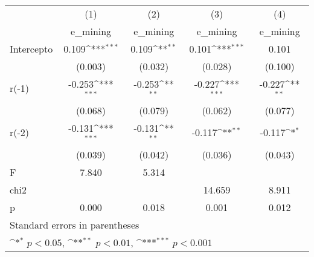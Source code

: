{
\def\sym#1{\ifmmode^{#1}\else\(^{#1}\)\fi}
\begin{longtable}{l*{4}{c}}
\hline\hline\endfirsthead\hline\endhead\hline\endfoot\endlastfoot
            &\multicolumn{1}{c}{(1)}&\multicolumn{1}{c}{(2)}&\multicolumn{1}{c}{(3)}&\multicolumn{1}{c}{(4)}\\
            &\multicolumn{1}{c}{e\_mining}&\multicolumn{1}{c}{e\_mining}&\multicolumn{1}{c}{e\_mining}&\multicolumn{1}{c}{e\_mining}\\
\hline
Intercepto  &       0.109\sym{***}&       0.109\sym{**} &       0.101\sym{***}&       0.101         \\
            &     (0.003)         &     (0.032)         &     (0.028)         &     (0.100)         \\
r(-1)       &      -0.253\sym{***}&      -0.253\sym{**} &      -0.227\sym{***}&      -0.227\sym{**} \\
            &     (0.068)         &     (0.079)         &     (0.062)         &     (0.077)         \\
r(-2)       &      -0.131\sym{***}&      -0.131\sym{**} &      -0.117\sym{**} &      -0.117\sym{*}  \\
            &     (0.039)         &     (0.042)         &     (0.036)         &     (0.043)         \\
\hline
F           &       7.840         &       5.314         &                     &                     \\
chi2        &                     &                     &      14.659         &       8.911         \\
p           &       0.000         &       0.018         &       0.001         &       0.012         \\
\hline\hline
\multicolumn{5}{l}{\footnotesize Standard errors in parentheses}\\
\multicolumn{5}{l}{\footnotesize \sym{*} \(p<0.05\), \sym{**} \(p<0.01\), \sym{***} \(p<0.001\)}\\
\end{longtable}
}
